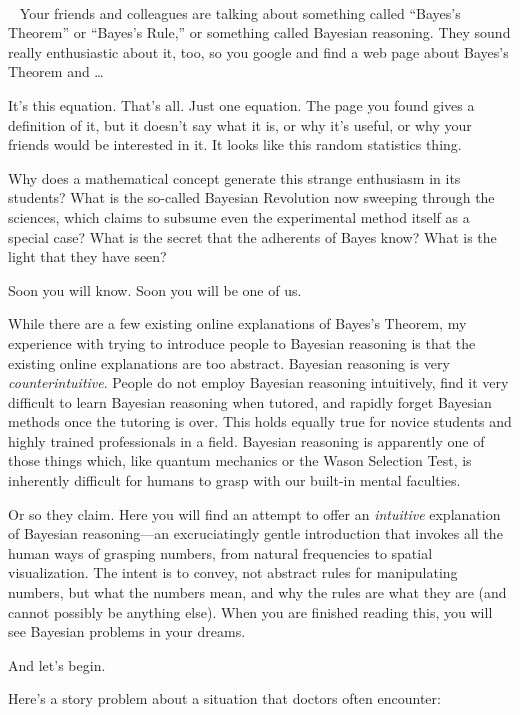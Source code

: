 {
\textit{ ~}}

{
\textit{\ } Your friends and colleagues are talking about something
called ``Bayes's
Theorem'' or
``Bayes's Rule,'' or
something called Bayesian reasoning. They sound really enthusiastic
about it, too, so you google and find a web page about
Bayes's Theorem and \ldots}

{
 It's this equation. That's all.
Just one equation. The page you found gives a definition of it, but it
doesn't say what it is, or why it's
useful, or why your friends would be interested in it. It looks like
this random statistics thing.}

{
 Why does a mathematical concept generate this strange enthusiasm
in its students? What is the so-called Bayesian Revolution now sweeping
through the sciences, which claims to subsume even the experimental
method itself as a special case? What is the secret that the adherents
of Bayes know? What is the light that they have seen?}

{
 Soon you will know. Soon you will be one of us.}

{
 While there are a few existing online explanations of
Bayes's Theorem, my experience with trying to introduce
people to Bayesian reasoning is that the existing online explanations
are too abstract. Bayesian reasoning is very \textit{counterintuitive}.
People do not employ Bayesian reasoning intuitively, find it very
difficult to learn Bayesian reasoning when tutored, and rapidly forget
Bayesian methods once the tutoring is over. This holds equally true for
novice students and highly trained professionals in a field. Bayesian
reasoning is apparently one of those things which, like quantum
mechanics or the Wason Selection Test, is inherently difficult for
humans to grasp with our built-in mental faculties.}

{
 Or so they claim. Here you will find an attempt to offer an
\textit{intuitive} explanation of Bayesian reasoning---an
excruciatingly gentle introduction that invokes all the human ways of
grasping numbers, from natural frequencies to spatial visualization.
The intent is to convey, not abstract rules for manipulating numbers,
but what the numbers mean, and why the rules are what they are (and
cannot possibly be anything else). When you are finished reading this,
you will see Bayesian problems in your dreams.}

{
 And let's begin.}

{
 Here's a story problem about a situation that
doctors often encounter:}

